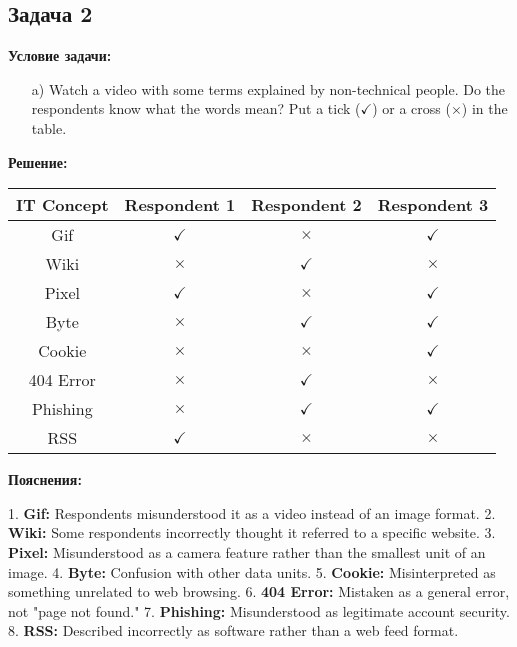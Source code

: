 \documentclass[a4paper,12pt]{article}
\begin{document}
\subsection{Задача 2}
\textbf{Условие задачи:}

\begin{itemize}
    \item[a)] Watch a video with some terms explained by non-technical people. Do the respondents know what the words mean? Put a tick (\(\checkmark\)) or a cross (\(\times\)) in the table.
\end{itemize}

\textbf{Решение:}


\begin{tabular}{|c|c|c|c|}
\hline
IT Concept & Respondent 1 & Respondent 2 & Respondent 3 \\ \hline
Gif       & \(\checkmark\) & \(\times\)    & \(\checkmark\) \\ \hline
Wiki      & \(\times\)    & \(\checkmark\) & \(\times\)    \\ \hline
Pixel     & \(\checkmark\) & \(\times\)    & \(\checkmark\) \\ \hline
Byte      & \(\times\)    & \(\checkmark\) & \(\checkmark\) \\ \hline
Cookie    & \(\times\)    & \(\times\)    & \(\checkmark\) \\ \hline
404 Error & \(\times\)    & \(\checkmark\) & \(\times\)    \\ \hline
Phishing  & \(\times\)    & \(\checkmark\) & \(\checkmark\) \\ \hline
RSS       & \(\checkmark\) & \(\times\)    & \(\times\)    \\ \hline
\end{tabular}

\textbf{Пояснения:}

1. \textbf{Gif:} Respondents misunderstood it as a video instead of an image format.
2. \textbf{Wiki:} Some respondents incorrectly thought it referred to a specific website.
3. \textbf{Pixel:} Misunderstood as a camera feature rather than the smallest unit of an image.
4. \textbf{Byte:} Confusion with other data units.
5. \textbf{Cookie:} Misinterpreted as something unrelated to web browsing.
6. \textbf{404 Error:} Mistaken as a general error, not "page not found."
7. \textbf{Phishing:} Misunderstood as legitimate account security.
8. \textbf{RSS:} Described incorrectly as software rather than a web feed format.
\end{document}
